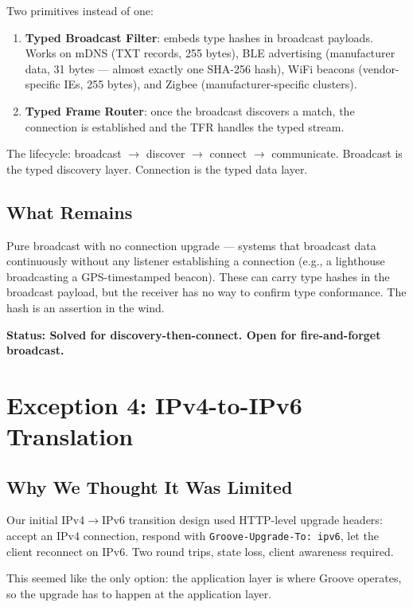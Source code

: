 \documentclass[11pt,a4paper]{article}
\begin{document}
Two primitives instead of one:

\begin{enumerate}
\item \textbf{Typed Broadcast Filter}: embeds type hashes in broadcast
  payloads. Works on mDNS (TXT records, 255 bytes), BLE advertising
  (manufacturer data, 31 bytes --- almost exactly one SHA-256 hash),
  WiFi beacons (vendor-specific IEs, 255 bytes), and Zigbee
  (manufacturer-specific clusters).

\item \textbf{Typed Frame Router}: once the broadcast discovers a match,
  the connection is established and the TFR handles the typed stream.
\end{enumerate}

The lifecycle: broadcast $\rightarrow$ discover $\rightarrow$
connect $\rightarrow$ communicate. Broadcast is the typed discovery
layer. Connection is the typed data layer.

\subsection{What Remains}

Pure broadcast with no connection upgrade --- systems that broadcast
data continuously without any listener establishing a connection (e.g.,
a lighthouse broadcasting a GPS-timestamped beacon). These can carry
type hashes in the broadcast payload, but the receiver has no way to
confirm type conformance. The hash is an assertion in the wind.

\textbf{Status: Solved for discovery-then-connect. Open for
fire-and-forget broadcast.}

\section{Exception 4: IPv4-to-IPv6 Translation}
\label{sec:ipv4v6}

\subsection{Why We Thought It Was Limited}

Our initial IPv4$\rightarrow$IPv6 transition design used HTTP-level
upgrade headers: accept an IPv4 connection, respond with
\texttt{Groove-Upgrade-To: ipv6}, let the client reconnect on IPv6.
Two round trips, state loss, client awareness required.

This seemed like the only option: the application layer is where Groove
operates, so the upgrade has to happen at the application layer.
\end{document}
